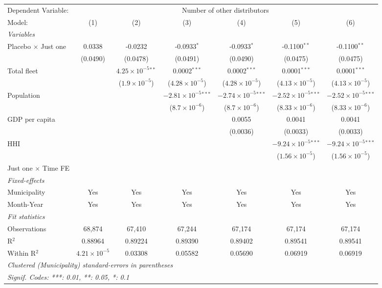 \documentclass[
]{article}
\begin{document}
\begin{tabular}{lcccccc}
\tabularnewline\midrule\midrule
Dependent Variable:&\multicolumn{6}{c}{Number of other distributors}\\
Model:&(1) & (2) & (3) & (4) & (5) & (6)\\
\midrule \emph{Variables}&   &   &   &   &   &  \\
Placebo $\times $ Just one & 0.0338 & -0.0232 & -0.0933$^{*}$ & -0.0933$^{*}$ & -0.1100$^{**}$ & -0.1100$^{**}$\\
  &(0.0490) & (0.0478) & (0.0491) & (0.0490) & (0.0475) & (0.0475)\\
Total fleet &    & $4.25\times 10^{-5}$$^{**}$ & 0.0002$^{***}$ & 0.0002$^{***}$ & 0.0001$^{***}$ & 0.0001$^{***}$\\
  &   & ($1.9\times 10^{-5}$) & ($4.28\times 10^{-5}$) & ($4.28\times 10^{-5}$) & ($4.13\times 10^{-5}$) & ($4.13\times 10^{-5}$)\\
Population &    &    & $-2.81\times 10^{-5}$$^{***}$ & $-2.74\times 10^{-5}$$^{***}$ & $-2.52\times 10^{-5}$$^{***}$ & $-2.52\times 10^{-5}$$^{***}$\\
  &   &    & ($8.7\times 10^{-6}$) & ($8.7\times 10^{-6}$) & ($8.33\times 10^{-6}$) & ($8.33\times 10^{-6}$)\\
GDP per capita &    &    &    & 0.0055 & 0.0041 & 0.0041\\
  &   &    &    & (0.0036) & (0.0033) & (0.0033)\\
HHI &    &    &    &    & $-9.24\times 10^{-5}$$^{***}$ & $-9.24\times 10^{-5}$$^{***}$\\
  &   &    &    &    & ($1.56\times 10^{-5}$) & ($1.56\times 10^{-5}$)\\
Just one $\times$ Time FE &  &  &  &  &  & \\
\midrule \emph{Fixed-effects}&   &   &   &   &   &  \\
Municipality & Yes & Yes & Yes & Yes & Yes & Yes\\
Month-Year & Yes & Yes & Yes & Yes & Yes & Yes\\
\midrule \emph{Fit statistics}&  & & & & & \\
Observations & 68,874&67,410&67,244&67,174&67,174&67,174\\
R$^2$ & 0.88964&0.89224&0.89390&0.89402&0.89541&0.89541\\
Within R$^2$ & $4.21\times 10^{-5}$&0.03308&0.05582&0.05690&0.06919&0.06919\\
\midrule\midrule\multicolumn{7}{l}{\emph{Clustered (Municipality) standard-errors in parentheses}}\\
\multicolumn{7}{l}{\emph{Signif. Codes: ***: 0.01, **: 0.05, *: 0.1}}\\
\end{tabular}
\end{document}
